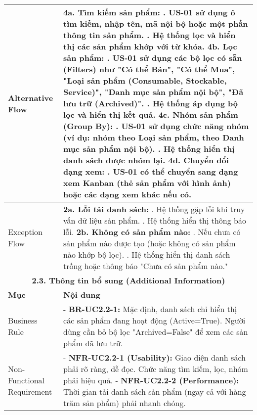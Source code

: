\begin{longtable}{|m{4cm}|p{11cm}|}
Alternative Flow & \textbf{4a. Tìm kiếm sản phẩm:} \newline    1. US-01 sử dụng ô tìm kiếm, nhập tên, mã nội bộ hoặc một phần thông tin sản phẩm. \newline    2. Hệ thống lọc và hiển thị các sản phẩm khớp với từ khóa. \newline \textbf{4b. Lọc sản phẩm:} \newline    1. US-01 sử dụng các bộ lọc có sẵn (Filters) như "Có thể Bán", "Có thể Mua", "Loại sản phẩm (Consumable, Stockable, Service)", "Danh mục sản phẩm nội bộ", "Đã lưu trữ (Archived)". \newline    2. Hệ thống áp dụng bộ lọc và hiển thị kết quả. \newline \textbf{4c. Nhóm sản phẩm (Group By):} \newline    1. US-01 sử dụng chức năng nhóm (ví dụ: nhóm theo Loại sản phẩm, theo Danh mục sản phẩm nội bộ). \newline    2. Hệ thống hiển thị danh sách được nhóm lại. \newline \textbf{4d. Chuyển đổi dạng xem:} \newline    1. US-01 có thể chuyển sang dạng xem Kanban (thẻ sản phẩm với hình ảnh) hoặc các dạng xem khác nếu có. \\
\hline
Exception Flow & \textbf{2a. Lỗi tải danh sách:} \newline    1. Hệ thống gặp lỗi khi truy vấn dữ liệu sản phẩm. \newline    2. Hệ thống hiển thị thông báo lỗi. \newline \textbf{2b. Không có sản phẩm nào:} \newline    1. Nếu chưa có sản phẩm nào được tạo (hoặc không có sản phẩm nào khớp bộ lọc). \newline    2. Hệ thống hiển thị danh sách trống hoặc thông báo "Chưa có sản phẩm nào." \\
\hline
\multicolumn{2}{|c|}{\textbf{2.3. Thông tin bổ sung (Additional Information)}} \\
\hline
\textbf{Mục} & \textbf{Nội dung} \\
\hline
Business Rule & - \textbf{BR-UC2.2-1:} Mặc định, danh sách chỉ hiển thị các sản phẩm đang hoạt động (Active=True). Người dùng cần bỏ bộ lọc "Archived=False" để xem các sản phẩm đã lưu trữ. \\
\hline
Non-Functional Requirement & - \textbf{NFR-UC2.2-1 (Usability):} Giao diện danh sách phải rõ ràng, dễ đọc. Chức năng tìm kiếm, lọc, nhóm phải hiệu quả. \newline - \textbf{NFR-UC2.2-2 (Performance):} Thời gian tải danh sách sản phẩm (ngay cả với hàng trăm sản phẩm) phải nhanh chóng. \\
\hline
\end{longtable}

